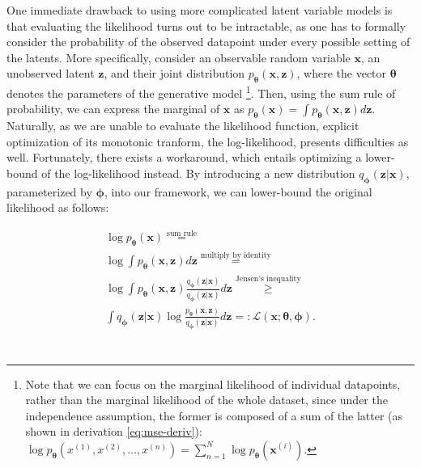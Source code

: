 \documentclass{report}
\begin{document}
\noindent One immediate drawback to using more complicated latent variable models is that evaluating the likelihood turns out to be intractable, as one has to formally consider the probability of the observed datapoint under every possible setting of the latents. More specifically, consider an observable random variable $\boldsymbol{x}$, an unobserved latent $\boldsymbol{z}$, and their joint distribution $p_{\boldsymbol{\theta}}(\boldsymbol{x}, \boldsymbol{z})$, where the vector $\boldsymbol{\theta}$ denotes the parameters of the generative model \footnote{Note that we can focus on the marginal likelihood of individual datapoints, rather than the marginal likelihood of the whole dataset, since under the independence assumption, the former is composed of a sum of the latter (as shown in derivation \ref{eq:mse-deriv}): $\log p_{\boldsymbol{\theta}} (x^{(1)}, x^{(2)}, \dots, x^{(n)}) = \sum_{n=1}^N \log p_{\boldsymbol{\theta}} (\boldsymbol{x}^{(i)})$.}. Then, using the sum rule of probability, we can express the marginal of $\boldsymbol{x}$ as $p_{\boldsymbol{\theta}}(\boldsymbol{x}) = \int p_{\boldsymbol{\theta}}(\boldsymbol{x}, \boldsymbol{z}) d \boldsymbol{z}$. \\

\noindent Naturally, as we are unable to evaluate the likelihood function, explicit optimization of its monotonic tranform, the log-likelihood, presents difficulties as well. Fortunately, there exists a workaround, which entails optimizing a lower-bound of the log-likelihood instead. By introducing a new distribution $q_{\boldsymbol{\phi}}(\boldsymbol{z} | \boldsymbol{x})$, parameterized by $\boldsymbol{\phi}$, into our framework, we can lower-bound the original likelihood as follows:

\begin{equation}
\begin{gathered}
\log p_{\boldsymbol{\theta}}(\boldsymbol{x}) \stackrel{\text{sum rule}}{=} \\
\log \int p_{\boldsymbol{\theta}}(\boldsymbol{x}, \boldsymbol{z}) d \boldsymbol{z} \stackrel{\text{multiply by identity}}{=} \\ 
\log \int p_{\boldsymbol{\theta}}(\boldsymbol{x}, \boldsymbol{z}) \frac{q_{\boldsymbol{\phi}}(\boldsymbol{z}|\boldsymbol{x})}{q_{\boldsymbol{\phi}}(\boldsymbol{z}|\boldsymbol{x})} d \boldsymbol{z} \stackrel{\text{Jensen's inequality}}{\geq} \\ 
\int q_{\boldsymbol{\phi}}(\boldsymbol{z}|\boldsymbol{x}) \log \frac{p_{\boldsymbol{\theta}}(\boldsymbol{x}, \boldsymbol{z})}{q_{\boldsymbol{\phi}}(\boldsymbol{z}|\boldsymbol{x})} d \boldsymbol{z} =: \mathcal{L}(\boldsymbol{x}; \boldsymbol{\theta}, \boldsymbol{\phi}). \\
\end{gathered}
\label{eq:free-energy}
\end{equation} \\
\end{document}
